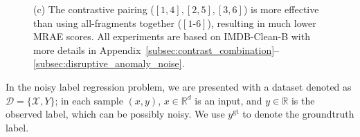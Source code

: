 \documentclass{article}
\theoremstyle{plain}
\theoremstyle{definition}
\theoremstyle{remark}
\begin{document}
\begin{figure}[t]
\begin{center}
{(c) The contrastive pairing ($[1, 4], [2, 5], [3, 6]$) is more effective than using all-fragments together ($[1\text{-}6]$), resulting in much lower MRAE scores.
All experiments are based on IMDB-Clean-B with more details in Appendix~\ref{subsec:contrast_combination}--\ref{subsec:disruptive_anomaly_noise}.
}
\label{fig:fragment_motivation}
\end{center}
\vskip -0.35in
\end{figure}
In the noisy label regression problem, we are presented with a dataset denoted as $\mathcal{D} = \{\mathcal{X}, Y\}$; in each sample $(x, y)$,  
 $x\in\mathbb{R}^d$ is an input, and $y \in \mathbb{R}$ is the observed label, which can be possibly noisy. We use  $y^\text{gt}$ to denote the groundtruth label. 
\end{document}
